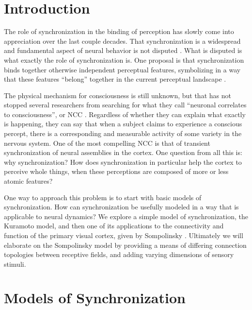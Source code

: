 \documentclass[12pt]{article}
\begin{document}
\maketitle

\section{Introduction}

The role of synchronization in the binding of perception has slowly come into appreciation over the last couple decades.  That synchronization is a widespread and fundamental aspect of neural behavior is not disputed \cite{Buzsaki}.  What is disputed is what exactly the role of synchronization is.  One proposal is that synchronization binds together otherwise independent perceptual features, symbolizing in a way that these features ``belong'' together in the current perceptual landscape \cite{Melloni}.  

The physical mechanism for consciousness is still unknown, but that has not stopped several researchers from searching for what they call ``neuronal correlates to consciousness'', or NCC \cite{Rees}.  Regardless of whether they can explain what exactly is happening, they can say that when a subject claims to experience a conscious percept, there is a corresponding and measurable activity of some variety in the nervous system.  One of the most compelling NCC is that of transient synchronization of neural assemblies in the cortex.  One question from all this is: why synchronization?  How does synchronization in particular help the cortex to perceive whole things, when these perceptions are composed of more or less atomic features?  

One way to approach this problem is to start with basic models of synchronization.  How can synchronization be usefully modeled in a way that is applicable to neural dynamics?  We explore a simple model of synchronization, the Kuramoto model, and then one of its applications to the connectivity and function of the primary visual cortex, given by Sompolinsky \cite{Sompolinsky}.  Ultimately we will elaborate on the Sompolinsky model by providing a means of differing connection topologies between receptive fields, and adding varying dimensions of sensory stimuli.

\section{Models of Synchronization}
\end{document}
